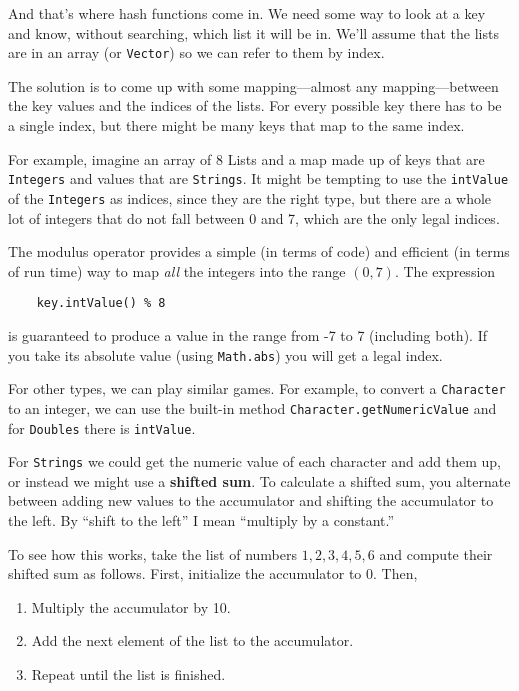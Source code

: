 And that's where hash functions come in.  We need some way to look at
a key and know, without searching, which list it will be in.  We'll
assume that the lists are in an array (or {\tt Vector}) so we can
refer to them by index.

The solution is to come up with some mapping---almost any
mapping---between the key values and the indices of the lists.
For every possible key there has to be a single index, but
there might be many keys that map to the same index.

For example, imagine an array of 8 Lists and a map made
up of keys that are {\tt Integers} and values that are
{\tt Strings}.  It might be tempting to use the
{\tt intValue} of the {\tt Integers} as indices, since they
are the right type, but there are a whole lot of integers
that do not fall between 0 and 7, which are the only legal
indices.


The modulus operator provides a simple
(in terms of code) and efficient (in terms of run time) way
to map {\em all} the integers into the range $(0, 7)$.
The expression

\begin{verbatim}
    key.intValue() % 8
\end{verbatim}
%
is guaranteed to produce a value in the range from -7 to 7 (including
both).  If you take its absolute value (using {\tt Math.abs}) you
will get a legal index.

For other types, we can play similar games.  For example,
to convert a {\tt Character} to an integer, we can use
the built-in method {\tt Character.getNumericValue} and
for {\tt Doubles} there is {\tt intValue}.


For {\tt Strings} we could get the numeric value of each character and
add them up, or instead we might use a {\bf shifted sum}.  To
calculate a shifted sum, you alternate between adding new values to
the accumulator and shifting the accumulator to the left.  By ``shift
to the left'' I mean ``multiply by a constant.''

To see how this works, take the list of numbers
${ 1, 2, 3, 4, 5, 6 }$ and compute their shifted sum as
follows.  First, initialize the accumulator to 0.  Then,

\begin{enumerate}

\item Multiply the accumulator by 10.

\item Add the next element of the list to the accumulator.

\item Repeat until the list is finished.

\end{enumerate}

